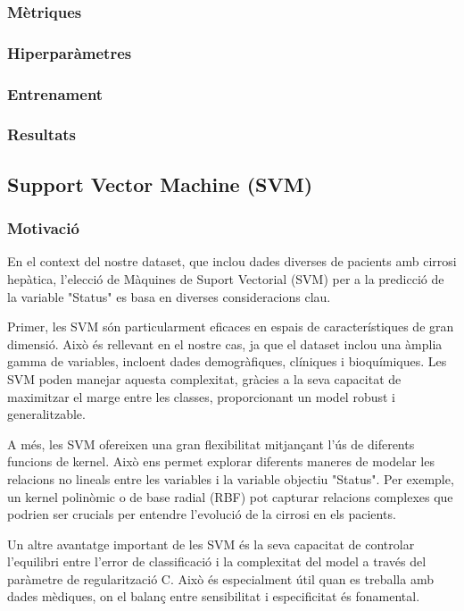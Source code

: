 \subsubsection{Mètriques}

\subsubsection{Hiperparàmetres}

\subsubsection{Entrenament}

\subsubsection{Resultats}

\subsection{Support Vector Machine (SVM)}

\subsubsection{Motivació}
En el context del nostre dataset, que inclou dades diverses de pacients amb cirrosi hepàtica, l'elecció de Màquines de Suport Vectorial (SVM) per a la predicció de la variable "Status" es basa en diverses consideracions clau.

Primer, les SVM són particularment eficaces en espais de característiques de gran dimensió. Això és rellevant en el nostre cas, ja que el dataset inclou una àmplia gamma de variables, incloent dades demogràfiques, clíniques i bioquímiques. Les SVM poden manejar aquesta complexitat, gràcies a la seva capacitat de maximitzar el marge entre les classes, proporcionant un model robust i generalitzable.

A més, les SVM ofereixen una gran flexibilitat mitjançant l'ús de diferents funcions de kernel. Això ens permet explorar diferents maneres de modelar les relacions no lineals entre les variables i la variable objectiu "Status". Per exemple, un kernel polinòmic o de base radial (RBF) pot capturar relacions complexes que podrien ser crucials per entendre l'evolució de la cirrosi en els pacients.

Un altre avantatge important de les SVM és la seva capacitat de controlar l'equilibri entre l'error de classificació i la complexitat del model a través del paràmetre de regularització C. Això és especialment útil quan es treballa amb dades mèdiques, on el balanç entre sensibilitat i especificitat és fonamental.

